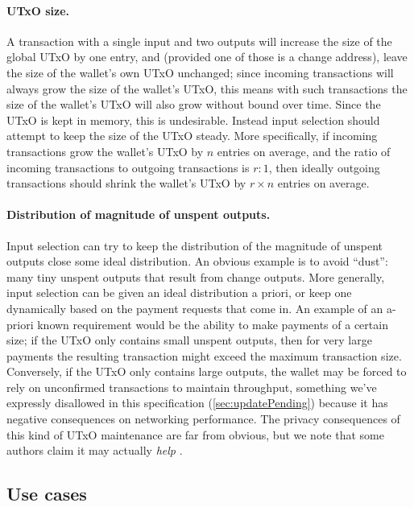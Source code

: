 \documentclass{article}
\theoremstyle{definition}{
  \newtheorem{lemma}{Lemma}[section] %
  \newtheorem{definition}[lemma]{Definition}
}
\theoremstyle{theorem}{
  \newtheorem{invariant}[lemma]{Invariant}
  \newtheorem{proofobligation}[lemma]{Proof Obligation}
}
\numberwithin{equation}{lemma}
\begin{document}
\paragraph{UTxO size.}
A transaction with a single input and two outputs will increase the size of the
global UTxO by one entry, and (provided one of those is a change address), leave
the size of the wallet's own UTxO unchanged; since incoming transactions will
always grow the size of the wallet's UTxO, this means with such transactions the
size of the wallet's UTxO will also grow without bound over time. Since the UTxO
is kept in memory, this is undesirable. Instead input selection should attempt
to keep the size of the UTxO steady. More specifically, if incoming transactions
grow the wallet's UTxO by $n$ entries on average, and the ratio of incoming
transactions to outgoing transactions is $r : 1$, then ideally outgoing
transactions should shrink the wallet's UTxO by $r \times n$ entries on average.

\paragraph{Distribution of magnitude of unspent outputs.}
Input selection can try to keep the distribution of the magnitude of unspent
outputs close some ideal distribution. An obvious example is to avoid ``dust'':
many tiny unspent outputs that result from change outputs. More generally,
input selection can be given an ideal distribution a priori, or keep one
dynamically based on the payment requests that come in. An example of an
a-priori known requirement would be the ability to make payments of a certain
size; if the UTxO only contains small unspent outputs, then for very large
payments the resulting transaction might exceed the maximum transaction size.
Conversely, if the UTxO only contains large outputs, the wallet may be forced to
rely on unconfirmed transactions to maintain throughput, something we've
expressly disallowed in this specification (\cref{sec:updatePending})
because it has negative consequences on networking performance.
The privacy consequences of this kind of UTxO maintenance are far from obvious,
but we note that some authors claim it may actually \emph{help}
\citep[Section 2]{10.1007/978-3-642-39884-1_2}.

\subsection{Use cases}
\label{sec:input_selection_use_cases}
\end{document}
